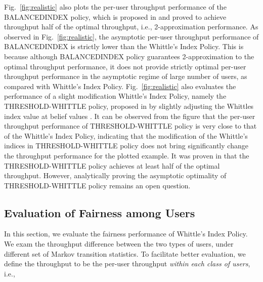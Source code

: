 \documentclass[11pt,twocolumn]{IEEEtran}
\begin{document}
Fig.~\ref{fig:realistic} also plots the per-user throughput performance of the BALANCEDINDEX  policy, which is proposed in \cite{ApproxRMBP} and proved to achieve throughput half of the optimal throughput, i.e., 2-approximation performance. As observed in Fig.~\ref{fig:realistic}, the asymptotic per-user throughput performance of BALANCEDINDEX is strictly lower than the Whittle's Index Policy. This is because although BALANCEDINDEX policy guarantees 2-approximation to the optimal throughput performance, it does not provide strictly optimal per-user throughput performance in the asymptotic regime of large number of users, as compared with Whittle's Index Policy. Fig.~\ref{fig:realistic} also evaluates the performance of a slight modification Whittle's Index Policy, namely the THRESHOLD-WHITTLE policy, proposed in \cite{ApproxRMBP} by slightly adjusting the Whittles index value at belief values . It can be observed from the figure that the per-user throughput performance of THRESHOLD-WHITTLE policy is very close to that of the Whittle's Index Policy, indicating that the modification of the Whittle's indices in THRESHOLD-WHITTLE policy does not bring significantly change the throughput performance for the plotted example. It was proven in \cite{ApproxRMBP} that the THRESHOLD-WHITTLE policy achieves at least half of the optimal  throughput. However, analytically proving the asymptotic optimality of THRESHOLD-WHITTLE policy remains an open question.

\subsection{Evaluation of Fairness among Users}

In this section, we evaluate the fairness performance of Whittle's Index Policy. We exam the throughput difference between the two types of users, under different set of Markov transition statistics. To facilitate better evaluation, we define the throughput  to be the per-user throughput \emph{within each class  of users}, i.e.,
\end{document}
